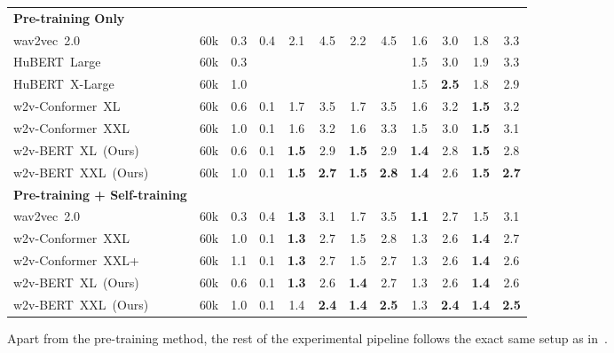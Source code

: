 \documentclass{article}
\begin{document}
\begin{table*}[htbp]
{\begin{tabular}{lccccccccccc}
    \midrule
    \bfseries Pre-training Only \\
    \quad wav2vec~2.0~\cite{xu2021self}
    & 60k & 0.3 &  0.4
    & 2.1 & 4.5 & 2.2 & 4.5
    & 1.6 & 3.0 & 1.8 & 3.3 \\ 
    \quad HuBERT~Large~\cite{hsu2021hubert}
    & 60k & 0.3 & 
    &  &  &  & 
    & 1.5 & 3.0 & 1.9 & 3.3 \\
    \quad HuBERT~X-Large~\cite{hsu2021hubert}
    & 60k & 1.0 & 
    &   &  &  & 
    &  1.5 & \textbf{2.5} & 1.8 & 2.9 \\
    \quad w2v-Conformer~XL~\cite{zhang2020pushing}
    & 60k & 0.6 & 0.1
    & 1.7 & 3.5 & 1.7 & 3.5
    & 1.6 & 3.2 & \bfseries 1.5 & 3.2 \\
    \quad w2v-Conformer~XXL~\cite{zhang2020pushing}
    & 60k & 1.0 & 0.1
    & 1.6 & 3.2 & 1.6 & 3.3 
    & 1.5 & 3.0 & \bfseries 1.5 & 3.1 \\
    \quad w2v-BERT~XL~(Ours)
    & 60k & 0.6 & 0.1
    & \textbf{1.5} & 2.9 & \bfseries 1.5 & 2.9
    & \bfseries 1.4 & 2.8 & \bfseries 1.5 & 2.8 \\
    \quad w2v-BERT~XXL~(Ours) 
    & 60k & 1.0 & 0.1
    & \textbf{1.5} & \textbf{2.7} & \textbf{1.5} & \textbf{2.8}
    & \textbf{1.4} & {2.6} & \textbf{1.5} & \textbf{2.7} \\
    \midrule
    \bfseries Pre-training + Self-training \\
    \quad  wav2vec~2.0~\cite{xu2021self}
    & 60k & 0.3 &  0.4
    & \bfseries 1.3 & 3.1 &  1.7 & 3.5
    & \bfseries 1.1 & 2.7 & 1.5 & 3.1 \\
    \quad  w2v-Conformer~XXL~\cite{zhang2020pushing}
    & 60k & 1.0 & 0.1
    &  \bfseries 1.3 & 2.7 & 1.5 & 2.8
    &  1.3 & 2.6 & \bfseries 1.4 & 2.7 \\
    \quad  w2v-Conformer~XXL+~\cite{zhang2020pushing}
    & 60k & 1.1 & 0.1
    &  \bfseries 1.3 & 2.7  & 1.5  & 2.7 
    &  1.3 &  2.6 & \bfseries 1.4 &  2.6 \\
    \quad  w2v-BERT~XL~(Ours)
    & 60k & 0.6 & 0.1
    &  \bfseries 1.3 & 2.6 & \bfseries 1.4 & 2.7
    &  1.3 & 2.6 & \bfseries 1.4 & 2.6 \\
    \quad  w2v-BERT~XXL~(Ours)
    & 60k & 1.0 & 0.1
    &  1.4 & \bfseries 2.4  & \bfseries 1.4  & \bfseries 2.5 
    &  1.3 & \bfseries 2.4 & \bfseries 1.4 & \bfseries 2.5 \\
    \bottomrule
  \end{tabular}
  }
\end{table*}

Apart from the pre-training method, the rest of the experimental pipeline follows the exact same setup as in~\cite{zhang2020pushing}.
\end{document}
